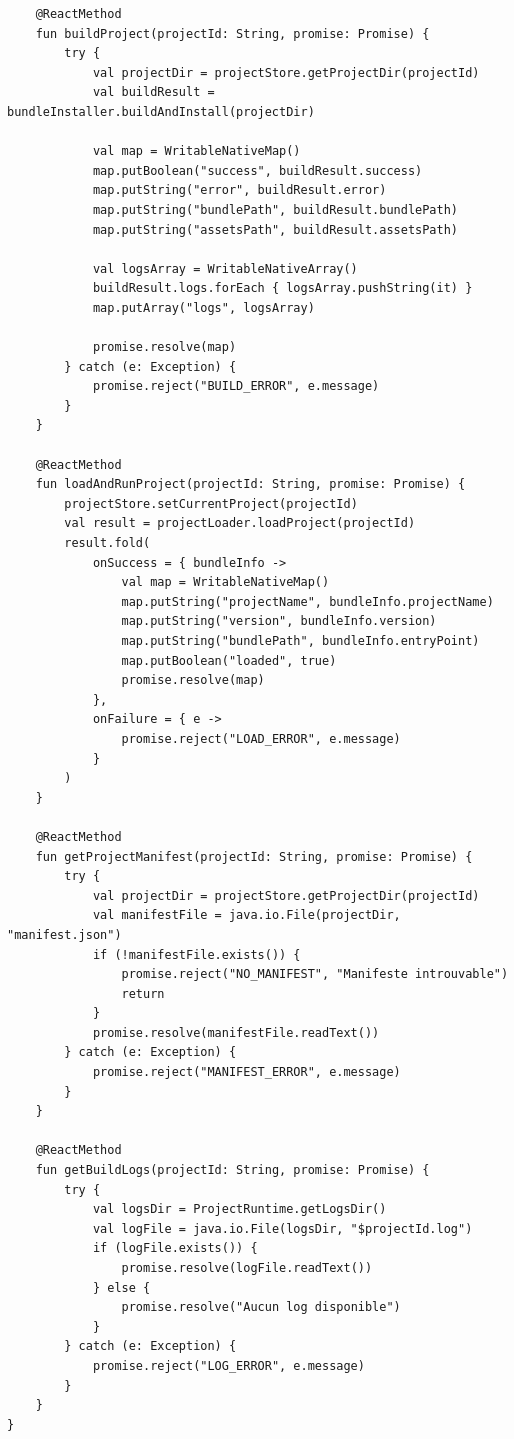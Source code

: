 \documentclass[11pt]{article}
\begin{document}
\begin{verbatim}
    @ReactMethod
    fun buildProject(projectId: String, promise: Promise) {
        try {
            val projectDir = projectStore.getProjectDir(projectId)
            val buildResult = bundleInstaller.buildAndInstall(projectDir)

            val map = WritableNativeMap()
            map.putBoolean("success", buildResult.success)
            map.putString("error", buildResult.error)
            map.putString("bundlePath", buildResult.bundlePath)
            map.putString("assetsPath", buildResult.assetsPath)

            val logsArray = WritableNativeArray()
            buildResult.logs.forEach { logsArray.pushString(it) }
            map.putArray("logs", logsArray)

            promise.resolve(map)
        } catch (e: Exception) {
            promise.reject("BUILD_ERROR", e.message)
        }
    }

    @ReactMethod
    fun loadAndRunProject(projectId: String, promise: Promise) {
        projectStore.setCurrentProject(projectId)
        val result = projectLoader.loadProject(projectId)
        result.fold(
            onSuccess = { bundleInfo ->
                val map = WritableNativeMap()
                map.putString("projectName", bundleInfo.projectName)
                map.putString("version", bundleInfo.version)
                map.putString("bundlePath", bundleInfo.entryPoint)
                map.putBoolean("loaded", true)
                promise.resolve(map)
            },
            onFailure = { e ->
                promise.reject("LOAD_ERROR", e.message)
            }
        )
    }

    @ReactMethod
    fun getProjectManifest(projectId: String, promise: Promise) {
        try {
            val projectDir = projectStore.getProjectDir(projectId)
            val manifestFile = java.io.File(projectDir, "manifest.json")
            if (!manifestFile.exists()) {
                promise.reject("NO_MANIFEST", "Manifeste introuvable")
                return
            }
            promise.resolve(manifestFile.readText())
        } catch (e: Exception) {
            promise.reject("MANIFEST_ERROR", e.message)
        }
    }

    @ReactMethod
    fun getBuildLogs(projectId: String, promise: Promise) {
        try {
            val logsDir = ProjectRuntime.getLogsDir()
            val logFile = java.io.File(logsDir, "$projectId.log")
            if (logFile.exists()) {
                promise.resolve(logFile.readText())
            } else {
                promise.resolve("Aucun log disponible")
            }
        } catch (e: Exception) {
            promise.reject("LOG_ERROR", e.message)
        }
    }
}
\end{verbatim}
\end{document}
